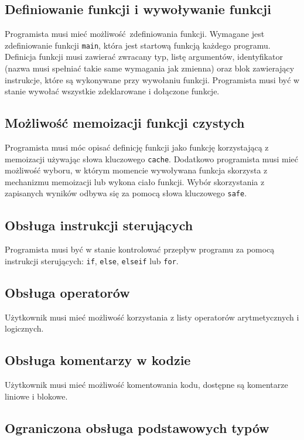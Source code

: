 \subsection{Definiowanie funkcji i wywoływanie funkcji}

Programista musi mieć możliwość zdefiniowania funkcji. Wymagane jest zdefiniowanie funkcji \verb|main|, która jest startową funkcją każdego programu. Definicja funkcji musi zawierać zwracany typ, listę argumentów, identyfikator (nazwa musi spełniać takie same wymagania jak zmienna) oraz blok zawierający instrukcje, które są wykonywane przy wywołaniu funkcji. Programista musi być w stanie wywołać wszystkie zdeklarowane i dołączone funkcje.

\subsection{Możliwość memoizacji funkcji czystych}

Programista musi móc opisać definicję funkcji jako funkcję korzystającą z memoizacji używając słowa kluczowego \verb|cache|. Dodatkowo programista musi mieć możliwość wyboru, w którym momencie wywoływana funkcja skorzysta z mechanizmu memoizacji lub wykona ciało funkcji. Wybór skorzystania z zapisanych wyników odbywa się za pomocą słowa kluczowego \verb|safe|.

\subsection{Obsługa instrukcji sterujących}

Programista musi być w stanie kontrolować przepływ programu za pomocą instrukcji sterujących: \verb|if|, \verb|else|, \verb|elseif| lub \verb|for|.

\subsection{Obsługa operatorów}

Użytkownik musi mieć możliwość korzystania z listy operatorów arytmetycznych i logicznych.

\subsection{Obsługa komentarzy w kodzie}

Użytkownik musi mieć możliwość komentowania kodu, dostępne są komentarze liniowe i blokowe.

\subsection{Ograniczona obsługa podstawowych typów}

